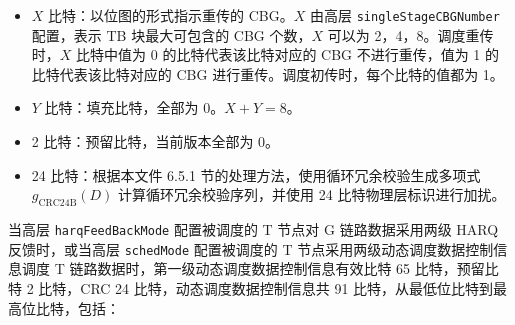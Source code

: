 \documentclass[11pt,a4paper]{ctexart}
\begin{document}
\begin{itemize}[nosep]
  \item $X$ 比特：以位图的形式指示重传的 CBG。$X$ 由高层 \texttt{singleStageCBGNumber} 配置，表示 TB 块最大可包含的 CBG 个数，$X$ 可以为 2，4，8。调度重传时，$X$ 比特中值为 0 的比特代表该比特对应的 CBG 不进行重传，值为 1 的比特代表该比特对应的 CBG 进行重传。调度初传时，每个比特的值都为 1。
  \item $Y$ 比特：填充比特，全部为 0。$X+Y=8$。
  \item 2 比特：预留比特，当前版本全部为 0。
  \item 24 比特：根据本文件 6.5.1 节的处理方法，使用循环冗余校验生成多项式 $g_{\mathrm{CRC24B}}(D)$ 计算循环冗余校验序列，并使用 24 比特物理层标识进行加扰。
\end{itemize}

当高层 \texttt{harqFeedBackMode} 配置被调度的 T 节点对 G 链路数据采用两级 HARQ 反馈时，或当高层 \texttt{schedMode} 配置被调度的 T 节点采用两级动态调度数据控制信息调度 T 链路数据时，第一级动态调度数据控制信息有效比特 65 比特，预留比特 2 比特，CRC 24 比特，动态调度数据控制信息共 91 比特，从最低位比特到最高位比特，包括：
\end{document}
